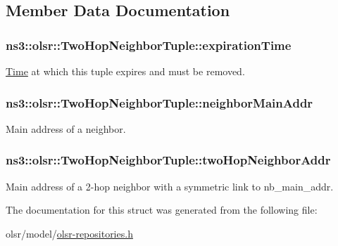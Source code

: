 \subsection{Member Data Documentation}
\subsubsection[{\texorpdfstring{expiration\+Time}{expirationTime}}]{ ns3\+::olsr\+::\+Two\+Hop\+Neighbor\+Tuple\+::expiration\+Time}\hypertarget{structns3_1_1olsr_1_1TwoHopNeighborTuple_ab703c9b62bd85f870b56b51d9e5ce9bb}{}\label{structns3_1_1olsr_1_1TwoHopNeighborTuple_ab703c9b62bd85f870b56b51d9e5ce9bb}


\hyperlink{classns3_1_1Time}{Time} at which this tuple expires and must be removed. 

\subsubsection[{\texorpdfstring{neighbor\+Main\+Addr}{neighborMainAddr}}]{ ns3\+::olsr\+::\+Two\+Hop\+Neighbor\+Tuple\+::neighbor\+Main\+Addr}\hypertarget{structns3_1_1olsr_1_1TwoHopNeighborTuple_a98657858d62fdc2fe9beb30bfb16a56f}{}\label{structns3_1_1olsr_1_1TwoHopNeighborTuple_a98657858d62fdc2fe9beb30bfb16a56f}


Main address of a neighbor. 

\subsubsection[{\texorpdfstring{two\+Hop\+Neighbor\+Addr}{twoHopNeighborAddr}}]{ ns3\+::olsr\+::\+Two\+Hop\+Neighbor\+Tuple\+::two\+Hop\+Neighbor\+Addr}\hypertarget{structns3_1_1olsr_1_1TwoHopNeighborTuple_a24f8a8ff95423260d2a1e1b0e39b98e8}{}\label{structns3_1_1olsr_1_1TwoHopNeighborTuple_a24f8a8ff95423260d2a1e1b0e39b98e8}


Main address of a 2-\/hop neighbor with a symmetric link to nb\+\_\+main\+\_\+addr. 



The documentation for this struct was generated from the following file\+:\begin{DoxyCompactItemize}
\item 
olsr/model/\hyperlink{olsr-repositories_8h}{olsr-\/repositories.\+h}\end{DoxyCompactItemize}
